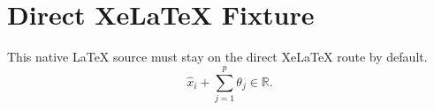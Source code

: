 \documentclass[11pt]{article}
\begin{document}
\section*{Direct XeLaTeX Fixture}
This native \LaTeX{} source must stay on the direct XeLaTeX route by default.
\[
\hat{x}_i + \sum_{j=1}^{p}\theta_j \in \mathbb{R}.
\]
\end{document}
